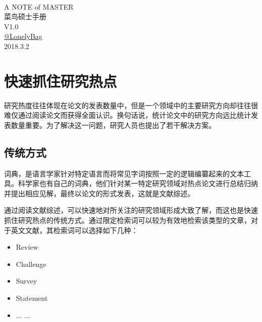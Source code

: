 \documentclass[UTF8]{ctexbook}
\begin{document}
\begin{center}  %
	\quad \\
	\vspace{3cm}
	\hspace{3cm}\Huge{A NOTE of MASTER}\\
	\hspace{3cm}\Huge{菜鸟硕士手册} \\
	\hspace{3cm}\large{V1.0} \\
	\vspace{5cm}
	\hspace{3cm}\href{https://github.com/lonelybag/Latex_lonelybag}{\Large{@LonelyBag}}\\
	\vspace{0.5cm}
	\hspace{3cm}\Large {2018.3.2}
	\clearpage  %
\end{center}

\thispagestyle{empty}
\clearpage  %
\tableofcontents
\clearpage
\newpage
\quad
\newpage
\clearpage
\section{快速抓住研究热点}
研究热度往往体现在论文的发表数量中，但是一个领域中的主要研究方向却往往很难仅通过阅读论文而获得全面认识。换句话说，统计论文中的研究方向远比统计发表数量重要。为了解决这一问题，研究人员也提出了若干解决方案。

\subsection{传统方式}
词典，是语言学家针对特定语言而将常见字词按照一定的逻辑编纂起来的文本工具。科学家也有自己的词典，他们针对某一特定研究领域对热点论文进行总结归纳并提出相应见解，最终以论文的形式发表，这就是文献综述。

通过阅读文献综述，可以快速地对所关注的研究领域形成大致了解，而这也是快速抓住研究热点的传统方式。通过限定检索词可以较为有效地检索该类型的文章，对于英文文献，其检索词可以选择如下几种：
\begin{itemize}
	\item Review
	\item Challenge
	\item Survey
	\item Statement
	\item ... ...
\end{itemize}
\end{document}
